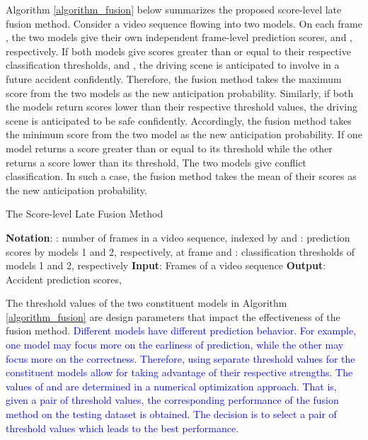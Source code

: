 \documentclass[journal]{IEEEtran}
\begin{document}
Algorithm \ref{algorithm_fusion} below summarizes the proposed score-level late fusion method. Consider a video sequence flowing into two models. On each frame , the two models give their own independent frame-level prediction scores,  and , respectively. If both models give scores greater than or equal to their respective classification thresholds,  and , the driving scene is anticipated to involve in a future accident confidently. Therefore, the fusion method takes the maximum score from the two models as the new anticipation probability. Similarly, if both the models return scores lower than their respective threshold values, the driving scene is anticipated to be safe confidently. Accordingly, the fusion method takes the minimum score from the two model as the new anticipation probability. If one model returns a score greater than or equal to its threshold while the other returns a score lower than its threshold, The two models give conflict classification. In such a case, the fusion method takes the mean of their scores as the new anticipation probability. 


\begin{algorithm}
\caption{The Score-level Late Fusion Method}\begin{algorithmic}
\STATE \textbf{Notation}: 
\STATE : number of frames in a video sequence, indexed by 
\STATE  and : prediction scores by models 1 and 2, respectively, at frame  
\STATE  and : classification thresholds of models 1 and 2, respectively
\STATE\textbf{Input}: Frames of a video sequence
\STATE \textbf{Output}: Accident prediction scores, 
\vspace{0.03in}
\FOR{}
\IF { \AND }
\STATE{}
\ELSIF{\textcolor{blue}{{ \AND }}}
\STATE\textcolor{blue}{{}}
\ELSE 
\STATE\textcolor{blue}{{}}
\ENDIF
\ENDFOR
\end{algorithmic}
\label{algorithm_fusion}
\end{algorithm}

The threshold values of the two constituent models in Algorithm \ref{algorithm_fusion} are design parameters that impact the effectiveness of the fusion method. \textcolor{blue}{Different models have different prediction behavior. For example, one model may focus more on the earliness of prediction, while the other may focus more on the correctness. Therefore, using separate threshold values for the constituent models allow for taking advantage of their respective strengths. The values of  and  are determined in a numerical optimization approach. That is, given a pair of threshold values, the corresponding performance of the fusion method on the testing dataset is obtained. The decision is to select a pair of threshold values which leads to the best performance.}
\end{document}
